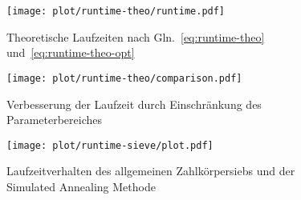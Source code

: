\begin{figure}[ht]
		\centering
		\texttt{[image: plot/runtime-theo/runtime.pdf]}
		\caption{Theoretische Laufzeiten nach Gln.~\eqref{eq:runtime-theo} und~\eqref{eq:runtime-theo-opt}}\label{fig:runtime-theo}
\end{figure}
\begin{figure}[ht]
		\centering
		\texttt{[image: plot/runtime-theo/comparison.pdf]}
		\caption{Verbesserung der Laufzeit durch Einschränkung des Parameterbereiches}\label{fig:runtime-theo-comparison}
\end{figure}
\begin{figure}[ht]
		\centering
		\texttt{[image: plot/runtime-sieve/plot.pdf]}
		\caption{Laufzeitverhalten des allgemeinen Zahlkörpersiebs und der Simulated Annealing Methode}\label{fig:runtime-sieve}
\end{figure}
